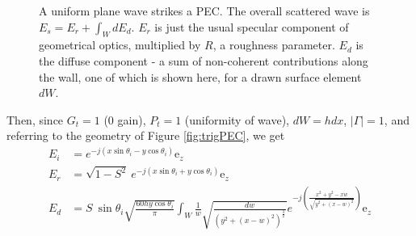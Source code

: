 \documentclass[lettersize,journal]{IEEEtran}
\begin{document}
\begin{figure}[H]
\begin{center}
            \caption{A uniform plane wave strikes a PEC. The overall scattered wave is
            $E_s = E_r + \int_W d E_d$. $E_r$ is just the usual specular component of
            geometrical optics, multiplied by $R$, a roughness parameter. $E_d$ is the
            diffuse component - a sum of non-coherent contributions along the wall, one
            of which is shown here, for a drawn surface element $dW$.}
            \label{fig:planeWavePEC}
            \end{center}
            \end{figure}
            Then, since $G_t = 1$ (0 gain), $P_t = 1$ (uniformity of wave), $dW = h dx$,
            $\lvert \Gamma \rvert = 1$, and referring to the geometry of Figure
            \ref{fig:trigPEC}, we get
            \small
            \begin{subequations}
                \begin{align}
                    E_i &= e^{-j(x \sin \theta_i - y \cos \theta_i)} \text{e}_z \\
                    E_r &= \sqrt{1 - S^{2}} \ e^{-j(x \sin \theta_i + y \cos \theta_i)}
                        \text{e}_z \\
                    E_d &= S \ \sin \theta_i \sqrt{\frac{60hy \cos \theta_i}{\pi}} \int_W
                    \frac{1}{w} \sqrt{\frac{ dw }{\left( y^{2} + (x - w)^{2} \right)^{\frac{3}{2}} }}
                    e^{-j\left(\frac{x^{2} + y^{2} -xw}{\sqrt{y^{2} +(x-w)^{2}} }\right)} \text{e}_z
                \end{align}
            \end{subequations}
\end{document}
